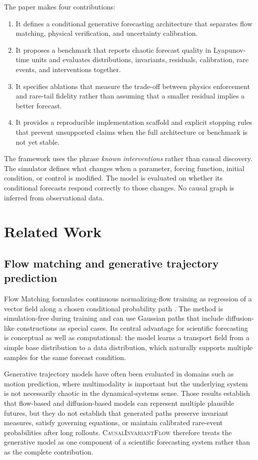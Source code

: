 \documentclass[11pt]{article}
\newcommand{\method}{\textsc{CausalInvariantFlow}}
\begin{document}
The paper makes four contributions:
\begin{enumerate}[leftmargin=*]
    \item It defines a conditional generative forecasting architecture that separates flow matching, physical verification, and uncertainty calibration.
    \item It proposes a benchmark that reports chaotic forecast quality in Lyapunov-time units and evaluates distributions, invariants, residuals, calibration, rare events, and interventions together.
    \item It specifies ablations that measure the trade-off between physics enforcement and rare-tail fidelity rather than assuming that a smaller residual implies a better forecast.
    \item It provides a reproducible implementation scaffold and explicit stopping rules that prevent unsupported claims when the full architecture or benchmark is not yet stable.
\end{enumerate}

The framework uses the phrase \emph{known interventions} rather than causal discovery. The simulator defines what changes when a parameter, forcing function, initial condition, or control is modified. The model is evaluated on whether its conditional forecasts respond correctly to those changes. No causal graph is inferred from observational data.

\section{Related Work}

\subsection{Flow matching and generative trajectory prediction}

Flow Matching formulates continuous normalizing-flow training as regression of a vector field along a chosen conditional probability path \cite{lipman2023flow}. The method is simulation-free during training and can use Gaussian paths that include diffusion-like constructions as special cases. Its central advantage for scientific forecasting is conceptual as well as computational: the model learns a transport field from a simple base distribution to a data distribution, which naturally supports multiple samples for the same forecast condition.

Generative trajectory models have often been evaluated in domains such as motion prediction, where multimodality is important but the underlying system is not necessarily chaotic in the dynamical-systems sense. Those results establish that flow-based and diffusion-based models can represent multiple plausible futures, but they do not establish that generated paths preserve invariant measures, satisfy governing equations, or maintain calibrated rare-event probabilities after long rollouts. \method{} therefore treats the generative model as one component of a scientific forecasting system rather than as the complete contribution.
\end{document}
